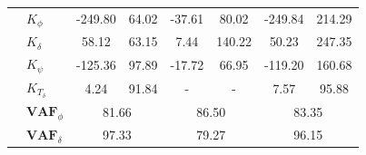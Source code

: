 \begin{table}[]
\begin{tabular}{llcccccc}
                                                   & $K_{\phi} $                                            & -249.80                                     & 64.02                                                & -37.61                                      & 80.02                                                & -249.84                                     & 214.29                                               \\
                                                   & $K_\delta $                                            & 58.12                                       & 63.15                                                & 7.44                                        & 140.22                                               & 50.23                                       & 247.35                                               \\
                                                   & $K_\psi $                                              & -125.36                                     & 97.89                                                & -17.72                                      & 66.95                                                & -119.20                                     & 160.68                                               \\
                                                   & $K_{T_\delta}$                                         & 4.24                                        & 91.84                                                & -                                           & -                                                    & 7.57                                        & 95.88                                                \\ \cline{2-8} 
                                                   & $\mathbf{VAF}_\phi$                                    & \multicolumn{2}{c}{81.66}                                                                          & \multicolumn{2}{c}{86.50}                                                                          & \multicolumn{2}{c}{83.35}                                                                          \\
                                                   & $\mathbf{VAF}_\delta$                                  & \multicolumn{2}{c}{97.33}                                                                          & \multicolumn{2}{c}{79.27}                                                                          & \multicolumn{2}{c}{96.15}                                                                          \\

\end{tabular}
\end{table}
